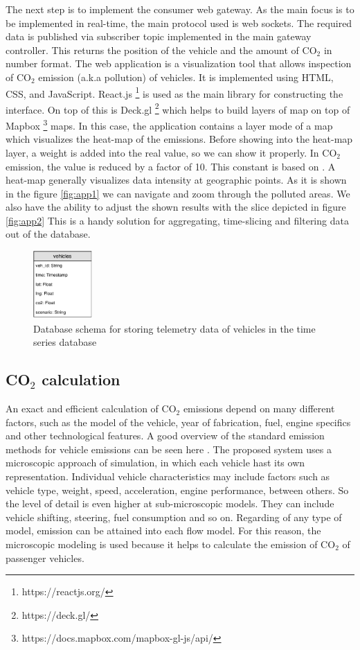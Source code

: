 \documentclass[letter, 10pt, conference]{ieeeconf}
\begin{document}
The next step is to implement the consumer web gateway.
As the main focus is to be implemented in real-time, the main protocol used is web sockets.
The required data is published via subscriber topic implemented in the main gateway controller.
This returns the position of the vehicle and the amount of CO$_2$ in number format.
The web application is a visualization tool that allows inspection of CO$_2$ emission (a.k.a pollution) of vehicles.
It is implemented using HTML, CSS, and JavaScript.
React.js \footnote{https://reactjs.org/} is used as the main library for constructing the interface.
On top of this is Deck.gl \footnote{https://deck.gl/} which helps to build layers of map on top of Mapbox \footnote{https://docs.mapbox.com/mapbox-gl-js/api/} maps.
In this case, the application contains a layer mode of a map which visualizes the heat-map of the emissions.
Before showing into the heat-map layer, a weight is added into the real value, so we can show it properly.
In CO$_2$ emission, the value is reduced by a factor of 10.
This constant is based on \cite{heisig_bridging_nodate}.
A heat-map generally visualizes data intensity at geographic points.
As it is shown in the figure \ref{fig:app1} we can navigate and zoom through the polluted areas.
We also have the ability to adjust the shown results with the slice depicted in figure \ref{fig:app2}
This is a handy solution for aggregating, time-slicing and filtering data out of the database.

\begin{figure}[h]
  \centering
  \includegraphics[width=0.2\textwidth]{db_schema}
  \caption{Database schema for storing telemetry data of vehicles in the time series database}
  \label{fig:db_schema}
\end{figure}

\subsection{CO$_2$ calculation}

An exact and efficient calculation of CO$_2$ emissions depend on many different factors, such as the model of the vehicle, year of fabrication, fuel, engine specifics and other technological features.
A good overview of the standard emission methods for vehicle emissions can be seen here \cite{potscher_co2-monitoring_2016}.
The proposed system uses a microscopic approach of simulation, in which each vehicle hast its own representation.
Individual vehicle characteristics may include factors such as vehicle type, weight, speed, acceleration, engine performance, between others.
So the level of detail is even higher at sub-microscopic models.
They can include vehicle shifting, steering, fuel consumption and so on.
Regarding of any type of model, emission can be attained into each flow model.
For this reason, the microscopic modeling is used because it helps to calculate the emission of CO$_2$ of passenger vehicles.
\end{document}
